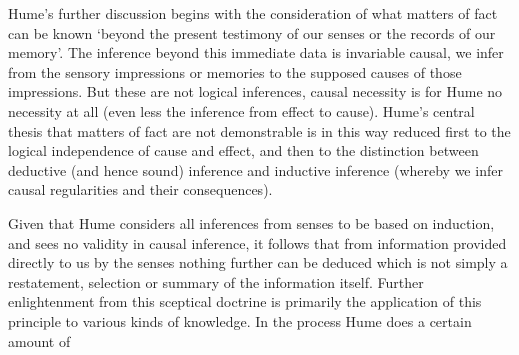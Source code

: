 Hume's further discussion begins with the consideration of what
matters of fact can be known `beyond the present testimony of 
our senses or the records of our memory'.
The inference beyond this immediate data is invariable causal, we
infer from the sensory impressions or memories to the supposed causes
of those impressions.
But these are not logical inferences, causal necessity is for Hume no
necessity at all (even less the inference from effect to cause).
Hume's central thesis that matters of fact are not demonstrable is
in this way reduced first to the logical independence of cause and
effect, and then to the distinction between deductive (and hence sound)
inference and inductive inference (whereby we infer causal
regularities and their consequences).

Given that Hume considers all inferences from senses to be based on
induction, and sees no validity in causal inference, it follows that
from information provided directly to us by the senses nothing further
can be deduced which is not simply a restatement, selection or summary
of the information itself.
Further enlightenment from this sceptical doctrine is primarily the
application of this principle to various kinds of knowledge.
In the process Hume does a certain amount of 



